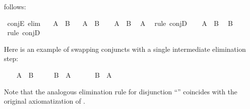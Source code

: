 \begin{isabellebody}
\begin{isamarkuptext}
  follows:%
\end{isamarkuptext}%
\isamarkuptrue%
\isamarkupfalse%
\ conjE\ {}elim{}{}\isanewline
\ \ \ {}A\ {}\ B{}\isanewline
\ \ \ A\ \ B\isanewline
%
\isadelimproof
%
\endisadelimproof
%
\isatagproof
{}\isamarkupfalse%
\isanewline
\ \ \isamarkupfalse%
\ {}A\ {}\ B{}\ \isamarkupfalse%
\ A\ \isamarkupfalse%
\ {}rule\ conjD\isanewline
\ \ \isamarkupfalse%
\ {}A\ {}\ B{}\ \isamarkupfalse%
\ B\ \isamarkupfalse%
\ {}rule\ conjD\isanewline
{}\isamarkupfalse%
%
\endisatagproof
{\isafoldproof}%
%
\isadelimproof
%
\endisadelimproof
%
\begin{isamarkuptext}%
\noindent Here is an example of swapping conjuncts with a single
  intermediate elimination step:%
\end{isamarkuptext}%
\isamarkuptrue%
%
\isadelimproof
%
\endisadelimproof
%
\isatagproof
\ \ \isamarkupfalse%
\ {}A\ {}\ B{}\isanewline
\ \ \isamarkupfalse%
\ \isamarkupfalse%
\ B\ \ A\ \isamarkupfalse%
\isanewline
\ \ \isamarkupfalse%
\ \isamarkupfalse%
\ {}B\ {}\ A{}\ \isamarkupfalse%
%
\endisatagproof
{\isafoldproof}%
%
\isadelimproof
%
\endisadelimproof
%
\begin{isamarkuptext}%
\noindent Note that the analogous elimination rule for disjunction
  ``'' coincides with
  the original axiomatization of .


\end{isamarkuptext}
\end{isabellebody}
